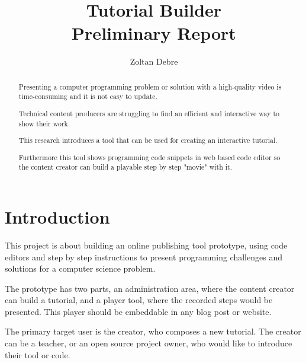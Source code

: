 \documentclass[11pt, a4paper, twoside, openright]{report}
\title{%
Tutorial Builder \\
\large Preliminary Report}
\author{Zoltan Debre}
\begin{document}
\frontmatter



\begin{abstract}

  Presenting a computer programming problem or solution with a high-quality video is time-consuming and it is not easy to update.

  Technical content producers are struggling to find an efficient and interactive way to show their work.

This research introduces a tool that can be used for creating an interactive tutorial.

Furthermore this tool shows programming code snippets in web based code editor so the content creator can build a playable step by step "movie" with it.

\end{abstract}


\maketitle

\tableofcontents


\mainmatter


\chapter{Introduction}

This project is about building an online publishing tool prototype, using code editors and step by step instructions to present programming challenges and solutions for a computer science problem.

The prototype has two parts, an administration area, where the content creator can build a tutorial, and a player tool, where the recorded steps would be presented. This player should be embeddable in any blog post or website.

The primary target user is the creator, who composes a new tutorial. The creator can be a teacher, or an open source project owner, who would like to introduce their tool or code.
\end{document}
